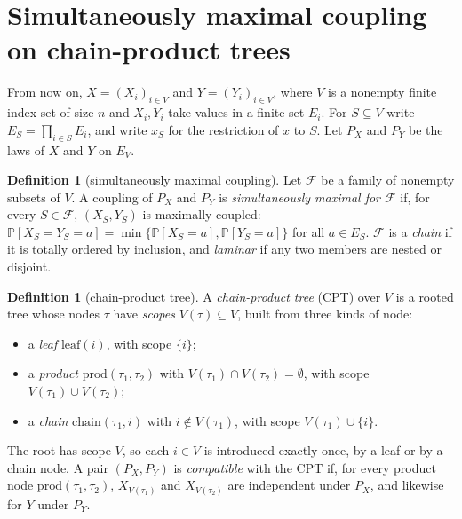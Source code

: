 \documentclass[11pt]{article}
\theoremstyle{definition}
\newtheorem{definition}[theorem]{Definition}
\newcommand{\Var}{V}
\newcommand{\F}{\mathcal{F}}
\renewcommand{\Pr}{\mathbb{P}}
\begin{document}
\section{Simultaneously maximal coupling on chain-product trees}\label{sec:cpt}

From now on, $X=(X_i)_{i\in\Var}$ and $Y=(Y_i)_{i\in\Var}$, where $\Var$ is a
nonempty finite index set of size $n$ and $X_i,Y_i$ take values in a finite set $E_i$. For
$S\subseteq\Var$ write $E_S=\prod_{i\in S}E_i$, and write $x_S$ for the
restriction of $x$ to $S$. Let $P_X$ and $P_Y$ be the laws of $X$ and $Y$ on
$E_\Var$.

\begin{definition}[simultaneously maximal coupling]
Let $\F$ be a family of nonempty subsets of $\Var$. A coupling of $P_X$ and $P_Y$
is \emph{simultaneously maximal for $\F$} if, for every $S\in\F$, $(X_S,Y_S)$ is
maximally coupled:
$\Pr[X_S=Y_S=a]=\min\{\Pr[X_S=a],\Pr[Y_S=a]\}$ for all $a\in E_S$. $\F$ is a
\emph{chain} if it is totally ordered by inclusion, and \emph{laminar} if any
two members are nested or disjoint.
\end{definition}

\begin{definition}[chain-product tree]
A \emph{chain-product tree} (CPT) over $\Var$ is a rooted tree whose nodes
$\tau$ have \emph{scopes} $\Var(\tau)\subseteq\Var$, built from three kinds of
node:
\begin{itemize}
  \item a \emph{leaf} $\mathrm{leaf}(i)$, with scope $\{i\}$;
  \item a \emph{product} $\mathrm{prod}(\tau_1,\tau_2)$ with $\Var(\tau_1)\cap\Var(\tau_2)=\emptyset$, with scope $\Var(\tau_1)\cup\Var(\tau_2)$;
  \item a \emph{chain} $\mathrm{chain}(\tau_1,i)$ with $i\notin\Var(\tau_1)$, with scope $\Var(\tau_1)\cup\{i\}$.
\end{itemize}
The root has scope $\Var$, so each $i\in\Var$ is introduced exactly once, by a
leaf or by a chain node. A pair $(P_X,P_Y)$ is \emph{compatible} with the CPT if,
for every product node $\mathrm{prod}(\tau_1,\tau_2)$, $X_{\Var(\tau_1)}$ and
$X_{\Var(\tau_2)}$ are independent under $P_X$, and likewise for $Y$ under $P_Y$.
\end{definition}
\end{document}
